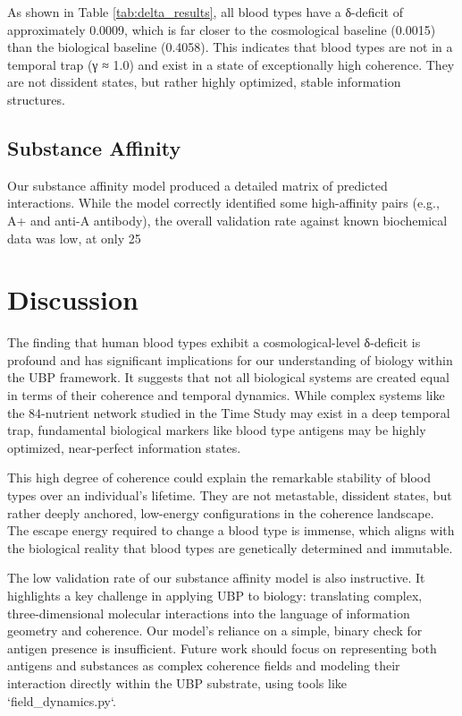 \documentclass{article}
\begin{document}
As shown in Table \ref{tab:delta_results}, all blood types have a δ-deficit of approximately 0.0009, which is far closer to the cosmological baseline (0.0015) than the biological baseline (0.4058). This indicates that blood types are not in a temporal trap (γ ≈ 1.0) and exist in a state of exceptionally high coherence. They are not dissident states, but rather highly optimized, stable information structures.

\subsection{Substance Affinity}

Our substance affinity model produced a detailed matrix of predicted interactions. While the model correctly identified some high-affinity pairs (e.g., A+ and anti-A antibody), the overall validation rate against known biochemical data was low, at only 25%

\section{Discussion}

The finding that human blood types exhibit a cosmological-level δ-deficit is profound and has significant implications for our understanding of biology within the UBP framework. It suggests that not all biological systems are created equal in terms of their coherence and temporal dynamics. While complex systems like the 84-nutrient network studied in the Time Study may exist in a deep temporal trap, fundamental biological markers like blood type antigens may be highly optimized, near-perfect information states.

This high degree of coherence could explain the remarkable stability of blood types over an individual's lifetime. They are not metastable, dissident states, but rather deeply anchored, low-energy configurations in the coherence landscape. The escape energy required to change a blood type is immense, which aligns with the biological reality that blood types are genetically determined and immutable.

The low validation rate of our substance affinity model is also instructive. It highlights a key challenge in applying UBP to biology: translating complex, three-dimensional molecular interactions into the language of information geometry and coherence. Our model's reliance on a simple, binary check for antigen presence is insufficient. Future work should focus on representing both antigens and substances as complex coherence fields and modeling their interaction directly within the UBP substrate, using tools like `field_dynamics.py`.
\end{document}
